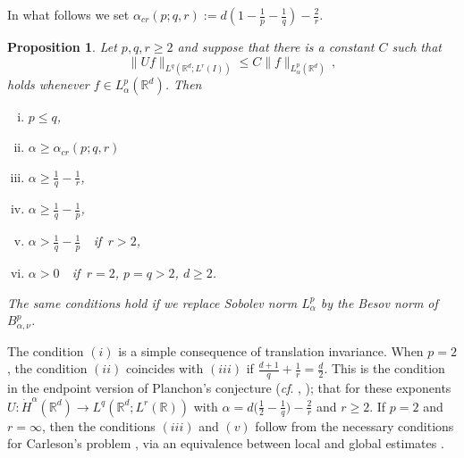 \documentclass[11pt]{amsart}
\newtheorem{proposition}[theorem]{Proposition}
\theoremstyle{definition}
\numberwithin{theorem}{section}
\numberwithin{definition}{section}
\numberwithin{equation}{section}
\newcommand{\R}{\mathbb{R}}
\renewcommand{\le}{\leqslant}
\renewcommand{\ge}{\geqslant}
\def\R{\mathbb R}
\def\cf{{\it cf}}
\def\bbR{{\mathbb {R}}}
\renewcommand{\le}{\leqslant}
\renewcommand{\ge}{\geqslant}
\begin{document}
In what follows we set
$\alpha_{cr}(p;q,r):= d(1-\frac 1p-\frac 1q)-\frac 2r$.


\begin{proposition}\label{necprop} Let $p,q,r\ge 2$ and
suppose that there is a constant $C$ such that
\begin{equation*}
\|Uf\|_{L^{q}(\bbR^d;L^r(I))}\le C\|f\|_{L^p_{\alpha}(\bbR^d)}\,,
\end{equation*}
holds whenever $f\in L^p_{\alpha}(\bbR^d)$.
Then
\begin{enumerate}[(i)]
\item  $p\le q$,
\item $ \alpha\ge \alpha_{cr}(p;q,r)$
\item $\alpha\ge \frac 1q-\frac 1r$,

\item $\alpha\ge  \frac 1q-\frac 1p$,


\item   $\alpha>  \frac 1q-\frac 1p$\ \ if\, $r>2$,

\item  $\alpha>  0$\ \  if\,  $r=2$, $p=q>2$, $d\ge 2$.


\end{enumerate}
The same conditions hold if we
replace
 Sobolev norm $L^p_{\alpha}$ by the
Besov norm  of
$B^p_{\alpha,\nu}$.
\end{proposition}


The condition $(i)$ is a simple consequence of translation invariance.
When  $p=2$, the condition $(ii)$ coincides with $(iii)$ if
$\frac{d+1}q+\frac 1r= \frac d2$. This is the condition in the
endpoint version of Planchon's conjecture (\cf. \cite{planch},
\cite{lerova}); that for these exponents $U:
\dot{H}^\alpha(\bbR^d)\to L^q(\R^d;L^r(\R))$ with
 $\alpha=d\big(\tfrac 12-\tfrac 1q\big)-\tfrac 2r$ and $r\ge 2$. If $p=2$ and $r=\infty$,  then the conditions $(iii)$  and $(v)$ follow from the necessary conditions for Carleson's problem \cite{camax,sj2}, via an equivalence between local and global estimates \cite{ro1}.
\end{document}
